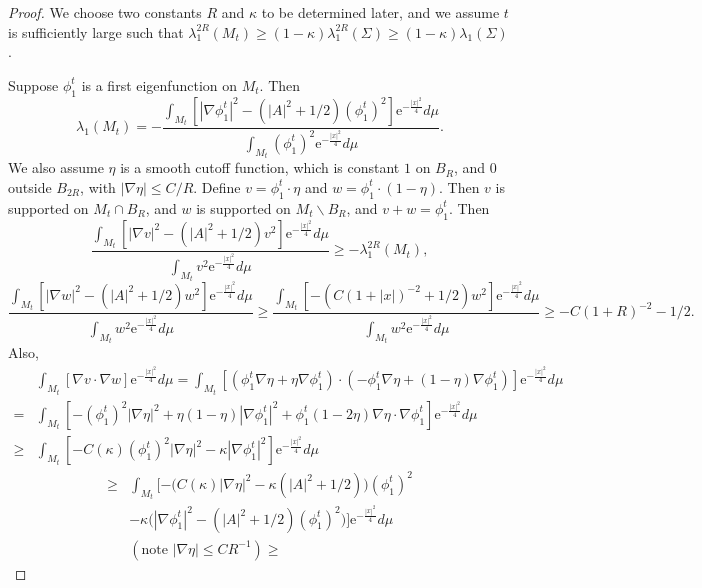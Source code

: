 \documentclass[12pt]{amsart}
\numberwithin{equation}{section}
\numberwithin{equation}{section}
\begin{document}
	\begin{proof}
		We choose two constants $R$ and $\kappa$ to be determined later, and we assume $t$ is sufficiently large such that $\lambda_1^{2R}(M_t)\geq (1-\kappa)\lambda_1^{2R}(\Sigma)\geq (1-\kappa)\lambda_1(\Sigma)$.
		
		Suppose $\phi_1^t$ is a first eigenfunction on $M_t$. Then
		\[\lambda_1(M_t)=-\frac{\int_{M_t}[|\nabla \phi_1^t|^2 -(|A|^2+1/2)(\phi_1^t)^2]\mathrm{e}^{-\frac{|x|^2}{4}}d\mu}{\int_{M_t}(\phi_1^t)^2\mathrm{e}^{-\frac{|x|^2}{4}}d\mu}.
		\]
		We also assume $\eta$ is a smooth cutoff function, which is constant $1$ on $B_R$, and $0$ outside $B_{2R}$, with $|\nabla \eta|\leq C/R$. Define $v=\phi_1^t \cdot\eta$ and $w=\phi_1^t\cdot(1-\eta)$. Then $v$ is supported on $M_t\cap B_R $, and $w$ is supported on $M_t\backslash B_R$, and $v+w=\phi_1^t$. Then
		\[
		\frac{\int_{M_t}[|\nabla v|^2 -(|A|^2+1/2)v^2]\mathrm{e}^{-\frac{|x|^2}{4}}d\mu}{\int_{M_t}v^2\mathrm{e}^{-\frac{|x|^2}{4}}d\mu} \geq -\lambda_1^{2R}(M_t),
		\]
		\[
		\frac{\int_{M_t}[|\nabla w|^2 -(|A|^2+1/2)w^2]\mathrm{e}^{-\frac{|x|^2}{4}}d\mu}{\int_{M_t}w^2\mathrm{e}^{-\frac{|x|^2}{4}}d\mu}
		\geq 	\frac{\int_{M_t}[ -(C(1+|x|)^{-2}+1/2)w^2]\mathrm{e}^{-\frac{|x|^2}{4}}d\mu}{\int_{M_t}w^2\mathrm{e}^{-\frac{|x|^2}{4}}d\mu}
		\geq -C(1+R)^{-2}-1/2.
		\]
		Also, \begin{equation}\label{eq:eigenconverge1}
			\begin{split}
				&\int_{M_t}[\nabla v\cdot\nabla w] \mathrm{e}^{-\frac{|x|^2}{4}}d\mu
				=
				\int_{M_t}[(\phi_1^t\nabla \eta+\eta\nabla \phi_1^t)\cdot(-\phi_1^t\nabla\eta+(1-\eta)\nabla \phi_1^t)] \mathrm{e}^{-\frac{|x|^2}{4}}d\mu
				\\
				=&
				\int_{M_t}[-(\phi_1^t)^2|\nabla\eta|^2 +\eta(1-\eta)|\nabla \phi_1^t|^2
				+\phi_1^t(1-2\eta)\nabla\eta\cdot\nabla\phi_1^t] \mathrm{e}^{-\frac{|x|^2}{4}}d\mu
				\\
				\geq &
				\int_{M_t}[-C(\kappa)(\phi_1^t)^2|\nabla\eta|^2-\kappa|\nabla \phi_1^t|^2] \mathrm{e}^{-\frac{|x|^2}{4}}d\mu
			\end{split}
		\end{equation}
		\begin{equation}
			\begin{split}
				\geq &
				\int_{M_t}[-\big(C(\kappa)|\nabla\eta|^2-\kappa(|A|^{2}+1/2)\big)(\phi_1^t)^2
				\\
				&-\kappa\big(|\nabla \phi_1^t|^2-(|A|^2+1/2)(\phi_1^t)^2\big)] \mathrm{e}^{-\frac{|x|^2}{4}}d\mu\\
				&(\text{note $|\nabla \eta|\leq CR^{-1}$})\geq 

\end{split}
\end{equation}
\end{proof}
\end{document}
